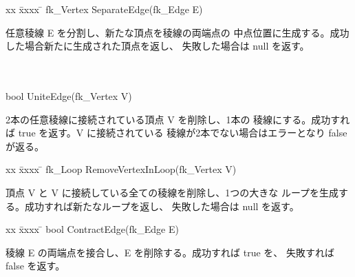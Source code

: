 \begin{tabbing}
xx \= xxxx \= \kill
 \> fk\_Vertex SeparateEdge(fk\_Edge E) \\
	\> \> \begin{minipage}[]{15cm}
		任意稜線 E を分割し、新たな頂点を稜線の両端点の
		中点位置に生成する。成功した場合新たに生成された頂点を返し、
		失敗した場合は null を返す。
	\end{minipage} \\ \\

 \> bool UniteEdge(fk\_Vertex V) \\
	\> \> \begin{minipage}[]{15cm}
		2本の任意稜線に接続されている頂点 V を削除し、1本の
		稜線にする。成功すれば true を返す。V に接続されている
		稜線が2本でない場合はエラーとなり false が返る。
	\end{minipage}
\end{tabbing}


\begin{tabbing}
xx \= xxxx \= \kill
 \> fk\_Loop RemoveVertexInLoop(fk\_Vertex V) \\
	\> \> \begin{minipage}[]{15cm}
		頂点 V と V に接続している全ての稜線を削除し、1つの大きな
		ループを生成する。成功すれば新たなループを返し、
		失敗した場合は null を返す。
	\end{minipage}
\end{tabbing}


\begin{tabbing}
xx \= xxxx \= \kill
 \> bool ContractEdge(fk\_Edge E) \\
	\> \> \begin{minipage}[]{15cm}
		稜線 E の両端点を接合し、E を削除する。成功すれば true を、
		失敗すれば false を返す。
	\end{minipage}
\end{tabbing}


